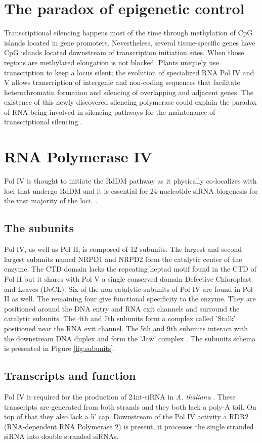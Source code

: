 \documentclass[a4paper, twocolumn]{article}
\begin{document}
\section{The paradox of epigenetic control}
Transcriptional silencing happens most of the time through methylation of CpG islands located in gene promoters. Nevertheless, several tissue-specific genes have CpG islands located downstream of transcription initiation sites. When those regions are methylated elongation is not blocked. 
Plants uniquely use transcription to keep a locus silent; the evolution of specialized RNA Pol IV and V allows transcription of intergenic and non-coding sequences that facilitate heterochromatin formation and silencing of overlapping and adjacent genes. 
The existence of this newly discovered silencing polymerase could explain the paradox of RNA being involved in silencing pathways for the maintenance of transcriptional silencing \cite{Herr118}.  

\section{RNA Polymerase IV}
Pol IV is thought to initiate the RdDM pathway as it physically co-localizes with loci that undergo RdDM and it is essential for 24-nucleotide siRNA biogenesis for the
vast majority of the loci. \cite{Pontes2006}. 

\subsection{The subunits}
Pol IV, as well as Pol II, is composed of 12 subunits. The largest and second largest subunits named NRPD1  and NRPD2 form the catalytic center of the enzyme. The CTD domain lacks the repeating heptad motif found in the CTD of Pol II but it shares with Pol V a single conserved domain Defective Chloroplast and Leaves (DeCL). 
Six of the non-catalytic subunits of Pol IV are found in Pol II as well. The remaining four give functional specificity to the enzyme. They are positioned around the DNA entry and RNA exit channels and surround the catalytic subunits. The 4th and 7th subunits form a complex called 'Stalk' positioned near the RNA exit channel. The 5th and 9th subunits interact with the downstream DNA duplex and form the 'Jaw' complex \cite{ZHOU2015}. The subunits schema is presented in Figure \ref{fig:subunits}.

\subsection{Transcripts and function}
Pol IV is required for the production of 24nt-siRNA in \textit{A. thaliana}  \cite{Zhang130}. These transcripts are generated from both strands and they both lack a poly-A tail. On top of that they also lack a 5' cap. Downstream of the Pol IV activity a RDR2 (RNA-dependent RNA Polymerase 2) is present, it processes the single stranded siRNA into double stranded siRNAs. 
\end{document}
